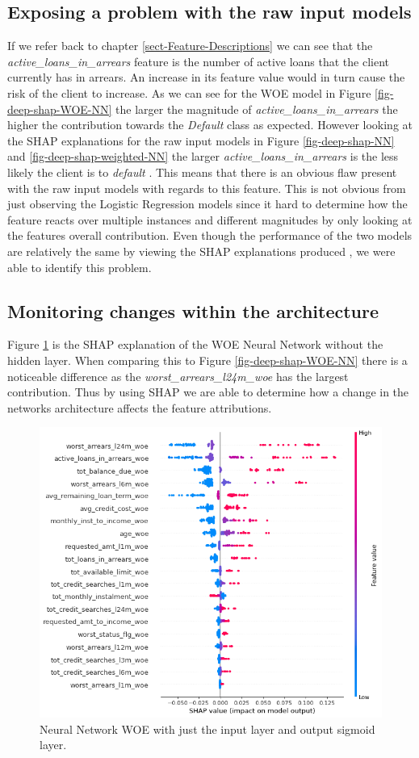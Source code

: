 \subsection{Exposing a problem with the raw input models} \label{sect-problem-expose}
If we refer back to chapter \ref{sect-Feature-Descriptions} we can see that  the \emph{active\_loans\_in\_arrears} feature is the number of active loans that the client currently has in arrears. An increase in its feature value would in turn cause the risk of the client to increase. As we can see for the WOE model in Figure \ref{fig-deep-shap-WOE-NN} the larger the magnitude of \emph{active\_loans\_in\_arrears} the higher the contribution towards the \emph{Default} class as expected. However looking at the SHAP explanations for the raw input models in Figure \ref{fig-deep-shap-NN} and \ref{fig-deep-shap-weighted-NN} the larger  \emph{active\_loans\_in\_arrears} is the less likely the client is to \emph{default} . This means that there is an obvious flaw present with the raw input models with regards to this feature. This is not obvious from just observing the Logistic Regression models since it hard to determine how the feature reacts over multiple instances and different magnitudes by only looking at the features overall contribution. Even though the performance of the two models are relatively the same by viewing the SHAP explanations produced , we were able to identify this problem.

\subsection{Monitoring changes within the architecture} \label{sect-architecure}
Figure \ref{fig-deep-shap-WOE-sig} is the SHAP explanation of the WOE Neural Network without the hidden layer. When comparing this to Figure \ref{fig-deep-shap-WOE-NN} there is a noticeable difference as the \emph{worst\_arrears\_l24m\_woe} has the largest contribution. Thus by using SHAP we are able to determine how a change in the networks architecture affects the feature attributions.
\begin{figure}[!htpb]
\centering
  \includegraphics[width=0.8\linewidth]{Credit_Images/Sigmoid_nn_shap.png}
   \caption{Neural Network WOE with just the input layer and output sigmoid layer.}
    \label{fig-deep-shap-WOE-sig}
\end{figure}

